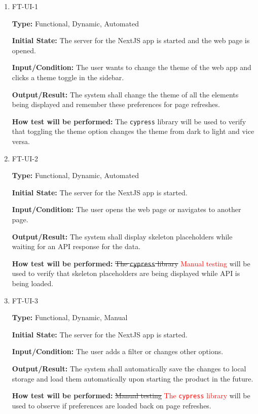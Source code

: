 \documentclass[12pt, titlepage]{article}
\begin{document}
\begin{enumerate}
\item{FT-UI-1}

\textbf{Type:} Functional, Dynamic, Automated
                    
\textbf{Initial State:} The server for the NextJS app is started and the web page is opened.
                    
\textbf{Input/Condition:} The user wants to change the theme of the web app and clicks a theme toggle in the sidebar.
                    
\textbf{Output/Result:} The system shall change the theme of all the elements being displayed and remember these preferences for page refreshes.
                    
\textbf{How test will be performed:} The \texttt{cypress} library will be used to verify that toggling the theme option changes the theme from dark to light and vice versa.

\item{FT-UI-2}

\textbf{Type:} Functional, Dynamic, Automated
                    
\textbf{Initial State:} The server for the NextJS app is started.
                    
\textbf{Input/Condition:} The user opens the web page or navigates to another page.
                    
\textbf{Output/Result:} The system shall display skeleton placeholders while waiting for an API response for the data.
                    
\textbf{How test will be performed:} \sout{The \texttt{cypress} library} \textcolor{red}{Manual testing} will be used to verify that skeleton placeholders are being displayed while API is being loaded.

\item{FT-UI-3}

\textbf{Type:} Functional, Dynamic, Manual
                    
\textbf{Initial State:} The server for the NextJS app is started.
                    
\textbf{Input/Condition:} The user adds a filter or changes other options.
                    
\textbf{Output/Result:} The system shall automatically save the changes to local storage and load them automatically upon starting the product in the future.
                    
\textbf{How test will be performed:} \sout{Manual testing} \textcolor{red}{The \texttt{cypress} library} will be used to observe if preferences are loaded back on page refreshes.
\end{enumerate}
\end{document}
